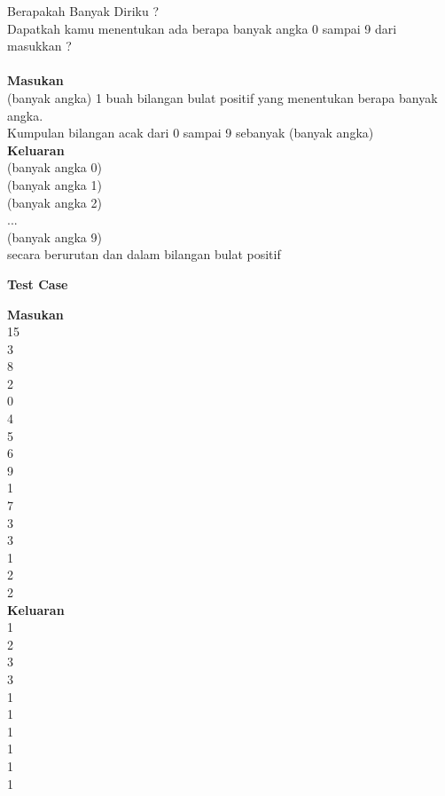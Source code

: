\newpage
\begin{permasalahan}{Berapakah Banyak Diriku ? }\\
\label{prob:BanyakDiriku}
	 Dapatkah kamu menentukan ada berapa banyak angka 0 sampai 9 dari masukkan ?\\\\
	\textbf{Masukan}\\
	(banyak angka) 1 buah bilangan bulat positif yang menentukan berapa banyak angka.\\
	Kumpulan bilangan acak dari 0 sampai 9 sebanyak (banyak angka) \\
	\textbf{Keluaran}\\
	(banyak angka 0)\\(banyak angka 1)\\(banyak angka 2)\\...\\(banyak angka 9)\\secara berurutan dan dalam bilangan bulat positif
	\begin{center}
	\textbf{Test Case}\\
	\end{center}
	\textbf{Masukan}\\
	15\\
	3\\
	8\\
	2\\
	0\\
	4\\
	5\\
	6\\
	9\\
	1\\
	7\\
	3\\
	3\\
	1\\
	2\\
	2\\
	\textbf{Keluaran}\\
		1\\2\\3\\3\\1\\1\\1\\1\\1\\1
\end{permasalahan}



